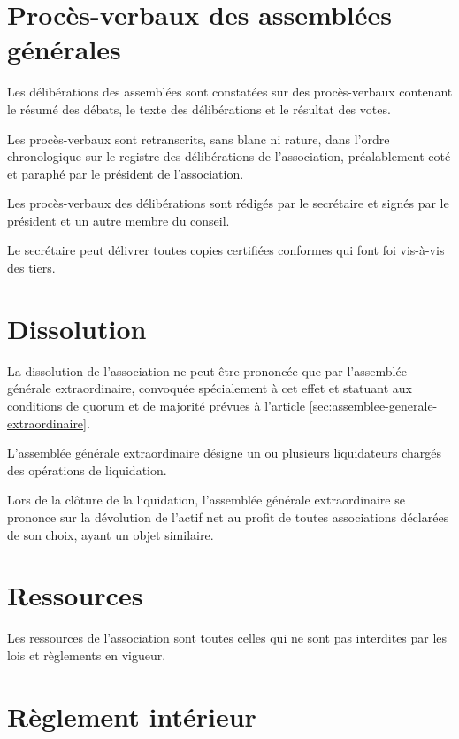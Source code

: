 \documentclass[12 pt]{article}
\begin{document}
\section{Procès-verbaux des assemblées générales}
\label{sec:proces-verbaux-des-assemblees-generales}

Les délibérations des assemblées sont constatées sur des
procès-verbaux contenant le résumé des débats, le texte des
délibérations et le résultat des votes.

Les procès-verbaux sont retranscrits, sans blanc ni rature, dans
l'ordre chronologique sur le registre des délibérations de
l'association, préalablement coté et paraphé par le président de
l'association.

Les procès-verbaux des délibérations sont rédigés par le secrétaire et
signés par le président et un autre membre du conseil.

Le secrétaire peut délivrer toutes copies certifiées conformes qui
font foi vis-à-vis des tiers.

\section{Dissolution}
\label{sec:dissolution}

La dissolution de l'association ne peut être prononcée que par
l'assemblée générale extraordinaire, convoquée spécialement à cet
effet et statuant aux conditions de quorum et de majorité prévues à
l'article \ref{sec:assemblee-generale-extraordinaire}.

L'assemblée générale extraordinaire désigne un ou plusieurs
liquidateurs chargés des opérations de liquidation.

Lors de la clôture de la liquidation, l'assemblée générale
extraordinaire se prononce sur la dévolution de l'actif net au profit
de toutes associations déclarées de son choix, ayant un objet
similaire.

\section{Ressources}
\label{sec:ressources}

Les ressources de l'association sont toutes celles qui ne sont pas
interdites par les lois et règlements en vigueur.

\section{Règlement intérieur}
\label{sec:reglement-interieur}
\end{document}
